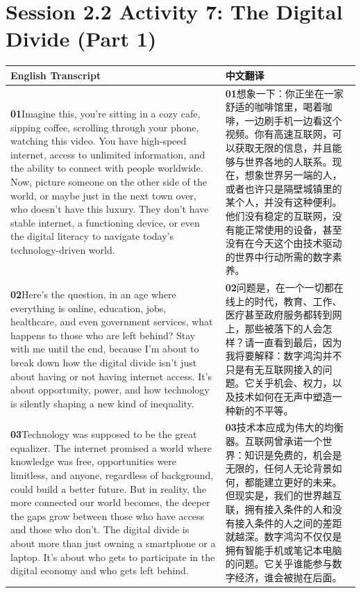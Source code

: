 \documentclass[UTF8,zihao=-4,fontset=fandol]{ctexart}
\newcommand{\TranscriptColumn}{\raggedright\arraybackslash\hyphenpenalty=10000\exhyphenpenalty=10000\sloppy}
\begin{document}
\clearpage
\section{Session 2.2 Activity 7: The Digital Divide (Part 1)}

\renewcommand{\arraystretch}{1.23}
\begin{longtable}{>{\TranscriptColumn}p{} >{\TranscriptColumn}p{}}
\rowcolor{headerBg}\textbf{English Transcript} & \textbf{中文翻译} \\ \hline
\textbf{01}\quad Imagine this, you're sitting in a cozy cafe, sipping coffee, scrolling through your phone, watching this video. You have high-speed internet, access to unlimited information, and the ability to connect with people worldwide. Now, picture someone on the other side of the world, or maybe just in the next town over, who doesn't have this luxury. They don't have stable internet, a functioning device, or even the digital literacy to navigate today's technology-driven world. & \textbf{01}\quad 想象一下：你正坐在一家舒适的咖啡馆里，喝着咖啡，一边刷手机一边看这个视频。你有高速互联网，可以获取无限的信息，并且能够与世界各地的人联系。现在，想象世界另一端的人，或者也许只是隔壁城镇里的某个人，并没有这种便利。他们没有稳定的互联网，没有能正常使用的设备，甚至没有在今天这个由技术驱动的世界中行动所需的数字素养。 \\ \hline
\textbf{02}\quad Here's the question, in an age where everything is online, education, jobs, healthcare, and even government services, what happens to those who are left behind? Stay with me until the end, because I'm about to break down how the digital divide isn't just about having or not having internet access. It's about opportunity, power, and how technology is silently shaping a new kind of inequality. & \textbf{02}\quad 问题是，在一个一切都在线上的时代，教育、工作、医疗甚至政府服务都转到网上，那些被落下的人会怎样？请一直看到最后，因为我将要解释：数字鸿沟并不只是有无互联网接入的问题。它关乎机会、权力，以及技术如何在无声中塑造一种新的不平等。 \\ \hline
\textbf{03}\quad Technology was supposed to be the great equalizer. The internet promised a world where knowledge was free, opportunities were limitless, and anyone, regardless of background, could build a better future. But in reality, the more connected our world becomes, the deeper the gaps grow between those who have access and those who don't. The digital divide is about more than just owning a smartphone or a laptop. It's about who gets to participate in the digital economy and who gets left behind. & \textbf{03}\quad 技术本应成为伟大的均衡器。互联网曾承诺一个世界：知识是免费的，机会是无限的，任何人无论背景如何，都能建立更好的未来。但现实是，我们的世界越互联，拥有接入条件的人和没有接入条件的人之间的差距就越深。数字鸿沟不仅仅是拥有智能手机或笔记本电脑的问题。它关乎谁能参与数字经济，谁会被抛在后面。 \\ \hline

\end{longtable}
\end{document}
